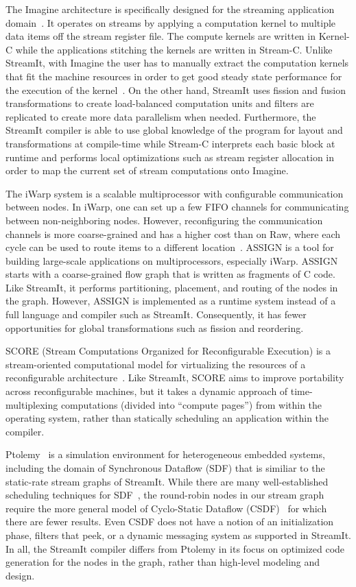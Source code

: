 The Imagine architecture is specifically designed for the streaming
application domain~\cite{rixner98bandwidthefficient}.  It operates on
streams by applying a computation kernel to multiple data items off
the stream register file.  The compute kernels are written in Kernel-C
while the applications stitching the kernels are written in Stream-C.
Unlike StreamIt, with Imagine the user has to manually extract the
computation kernels that fit the machine resources in order to get
good steady state performance for the execution of the
kernel~\cite{kapasi:2001:ss}.  On the other hand, StreamIt uses
fission and fusion transformations to create load-balanced computation
units and filters are replicated to create more data parallelism when
needed.  Furthermore, the StreamIt compiler is able to use global
knowledge of the program for layout and transformations at
compile-time while Stream-C interprets each basic block at runtime and
performs local optimizations such as stream register allocation in
order to map the current set of stream computations onto Imagine.

The iWarp system \cite{iwarp} is a scalable multiprocessor with
configurable communication between nodes.  In iWarp, one can set up a
few FIFO channels for communicating between non-neighboring
nodes. However, reconfiguring the communication channels is more
coarse-grained and has a higher cost than on Raw, where each cycle can
be used to route items to a different location~\cite{scalaroperands}.
ASSIGN \cite{assign} is a tool for building large-scale applications
on multiprocessors, especially iWarp.  ASSIGN starts with a
coarse-grained flow graph that is written as fragments of C code.
Like StreamIt, it performs partitioning, placement, and routing of the
nodes in the graph.  However, ASSIGN is implemented as a runtime
system instead of a full language and compiler such as StreamIt.
Consequently, it has fewer opportunities for global transformations
such as fission and reordering.

SCORE (Stream Computations Organized for Reconfigurable Execution) is
a stream-oriented computational model for virtualizing the resources
of a reconfigurable architecture~\cite{score}.  Like StreamIt, SCORE
aims to improve portability across reconfigurable machines, but it
takes a dynamic approach of time-multiplexing computations (divided
into ``compute pages'') from within the operating system, rather than
statically scheduling an application within the compiler.

Ptolemy~\cite{ptolemyoverview} is a simulation environment for
heterogeneous embedded systems, including the domain of Synchronous
Dataflow (SDF) that is similiar to the static-rate stream graphs of
StreamIt.  While there are many well-established scheduling techniques
for SDF~\cite{leesdf}, the round-robin nodes in our stream graph
require the more general model of Cyclo-Static Dataflow
(CSDF)~\cite{BELP96} for which there are fewer results.  Even CSDF
does not have a notion of an initialization phase, filters that peek,
or a dynamic messaging system as supported in StreamIt.  In all, the
StreamIt compiler differs from Ptolemy in its focus on optimized code
generation for the nodes in the graph, rather than high-level modeling
and design.

